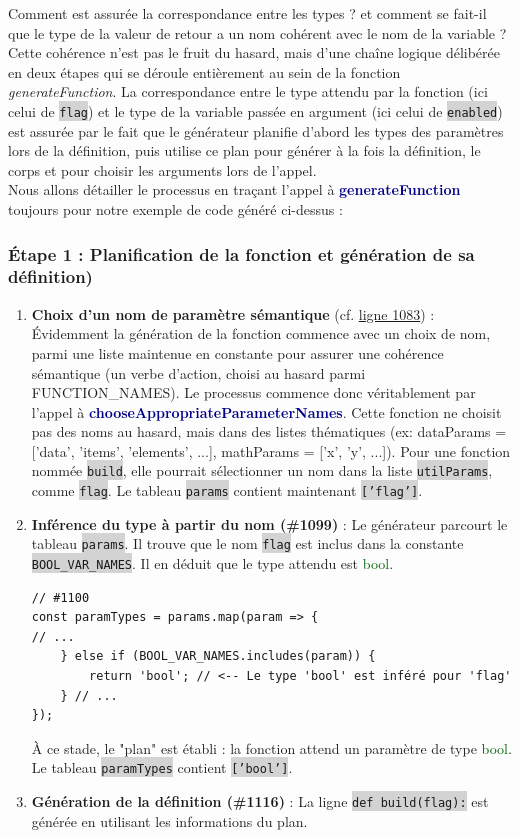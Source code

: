 \documentclass[11pt,a4paper]{article}
\newcommand{\code}[1]{\colorbox{lightgray}{\texttt{\small #1}}}
\newcommand{\vartype}[1]{\textcolor{darkgreen}{#1}}
\newcommand{\methodname}[1]{\textbf{\textcolor{darkblue}{#1}}}
\begin{document}
Comment est assurée la correspondance entre les types ? et comment se fait-il que le type de la valeur de retour a un nom cohérent avec le nom de la variable ? Cette cohérence n'est pas le fruit du hasard, mais d'une chaîne logique délibérée en deux étapes qui se déroule entièrement au sein de la fonction \textit{generateFunction}. La correspondance entre le type attendu par la fonction (ici celui de \code{flag}) et le type de la variable passée en argument (ici celui de \code{enabled}) est assurée par le fait que le générateur planifie d'abord les types des paramètres lors de la définition, puis utilise ce plan pour générer à la fois la définition, le corps et pour choisir les arguments lors de l'appel. \\ Nous allons détailler le processus en traçant l'appel à \methodname{generateFunction} toujours pour notre exemple de code généré ci-dessus :
\subsubsection*{Étape 1 : Planification de la fonction et génération de sa définition)}
\begin{enumerate}
\item \textbf{Choix d'un nom de paramètre sémantique} (cf. \href{https://github.com/edu-mateescoj/gyminf/blob/main/static/js/code-generator.js#L1083}{ligne 1083}) : Évidemment la génération de la fonction commence avec un choix de nom, parmi une liste maintenue en constante pour assurer une cohérence sémantique (un verbe d’action, choisi au hasard parmi FUNCTION\_NAMES). Le processus commence donc véritablement par l’appel à \methodname{chooseAppropriateParameterNames}. Cette fonction ne choisit pas des noms au hasard, mais dans des listes thématiques (ex: dataParams = ['data', 'items', 'elements', ...], mathParams = ['x', 'y', ...]).  Pour une fonction nommée \code{build}, elle pourrait sélectionner un nom dans la liste \code{utilParams}, comme \code{flag}. Le tableau \code{params} contient maintenant \code{['flag']}.

\item \textbf{Inférence du type à partir du nom (\#1099)} : Le générateur parcourt le tableau \code{params}. Il trouve que le nom \code{flag} est inclus dans la constante \code{BOOL\_VAR\_NAMES}. Il en déduit que le type attendu est \vartype{bool}.
\begin{verbatim}
// #1100
const paramTypes = params.map(param => {
// ...
    } else if (BOOL_VAR_NAMES.includes(param)) {
        return 'bool'; // <-- Le type 'bool' est inféré pour 'flag'
    } // ...
});
\end{verbatim}
À ce stade, le "plan" est établi : la fonction attend un paramètre de type \vartype{bool}. Le tableau \code{paramTypes} contient \code{['bool']}.

\item \textbf{Génération de la définition (\#1116)} : La ligne \code{def build(flag):} est générée en utilisant les informations du plan.

\end{enumerate}
\end{document}

